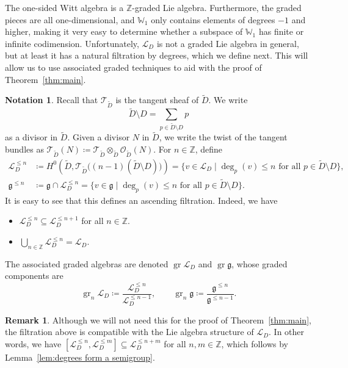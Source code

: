 \documentclass[12pt]{amsart}
\theoremstyle{plain}
\theoremstyle{definition}
\newtheorem{notation}[theorem]{Notation}
\newtheorem{remark}[theorem]{Remark}
\numberwithin{equation}{section}
\def\g{\mathfrak{g}}
\def\L{\mathcal{L}}
\def\T{\mathcal{T}}
\def\O{\mathcal{O}}
\def\ZZ{\mathbb{Z}}
\def\WW{\mathbb{W}}
\DeclareMathOperator{\gr}{gr}
\begin{document}
The one-sided Witt algebra is a $\ZZ$-graded Lie algebra. Furthermore, the graded pieces are all one-dimensional, and $\WW_1$ only contains elements of degrees $-1$ and higher, making it very easy to determine whether a subspace of $\WW_1$ has finite or infinite codimension. Unfortunately, $\L_D$ is not a graded Lie algebra in general, but at least it has a natural filtration by degrees, which we define next. This will allow us to use associated graded techniques to aid with the proof of Theorem~\ref{thm:main}.

\begin{notation}
    Recall that $\T_{\widetilde{D}}$ is the tangent sheaf of $\widetilde{D}$. We write
    $$\widetilde{D} \setminus D = \sum_{p\in \widetilde{D}\setminus D} p$$
    as a divisor in $\widetilde{D}$. Given a divisor $N$ in $\widetilde{D}$, we write the twist of the tangent bundles as $\T_{\widetilde{D}}(N) \coloneqq \T_{\widetilde{D}} \otimes_{\widetilde{D}} \O_{\widetilde{D}}(N)$. For $n \in \ZZ$, define
    \begin{align*}
        \L_D^{\leq n} &\coloneqq H^0\left(\widetilde{D},\T_{\widetilde{D}}\big((n - 1)(\widetilde{D} \setminus D)\big)\right) = \{v \in \L_D \mid \deg_p(v) \leq n \text{ for all } p \in \widetilde{D} \setminus D\}, \\
        \g^{\leq n} &\coloneqq \g \cap \L_D^{\leq n} = \{v \in \g \mid \deg_p(v) \leq n \text{ for all } p \in \widetilde{D} \setminus D\}.
    \end{align*}
    It is easy to see that this defines an ascending filtration. Indeed, we have
    \begin{itemize}
        \item $\L_D^{\leq n} \subseteq \L_D^{\leq n + 1}$ for all $n \in \ZZ$.
        \item $\bigcup_{n \in \ZZ} \L_D^{\leq n} = \L_D$.
    \end{itemize}
    The associated graded algebras are denoted $\gr \L_D$ and $\gr \g$, whose graded components are
    $$\gr_n \L_D \coloneqq \frac{\L_D^{\leq n}}{\L_D^{\leq n - 1}}, \qquad \gr_n \g \coloneqq \frac{\g^{\leq n}}{\g^{\leq n - 1}}.$$
\end{notation}

\begin{remark}\label{rem:filtration is compatible with Lie structure}
    Although we will not need this for the proof of Theorem~\ref{thm:main}, the filtration above is compatible with the Lie algebra structure of $\L_D$. In other words, we have $[\L_D^{\leq n}, \L_D^{\leq m}] \subseteq \L_D^{\leq n + m}$ for all $n,m \in \ZZ$, which follows by Lemma~\ref{lem:degrees form a semigroup}.
\end{remark}
\end{document}
